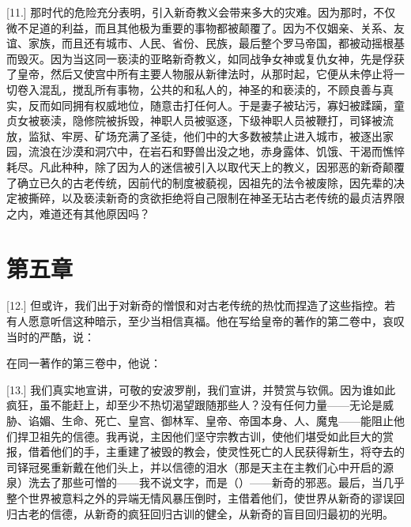 [11.] 那时代的危险充分表明，引入新奇教义会带来多大的灾难。因为那时，不仅微不足道的利益，而且其他极为重要的事物都被颠覆了。因为不仅姻亲、关系、友谊、家族，而且还有城市、人民、省份、民族，最后整个罗马帝国，都被动摇根基而毁灭。因为当这同一亵渎的亚略新奇教义，如同战争女神或复仇女神，先是俘获了皇帝，然后又使宫中所有主要人物服从新律法时，从那时起，它便从未停止将一切卷入混乱，搅乱所有事物，公共的和私人的，神圣的和亵渎的，不顾良善与真实，反而如同拥有权威地位，随意击打任何人。于是妻子被玷污，寡妇被蹂躏，童贞女被亵渎，隐修院被拆毁，神职人员被驱逐，下级神职人员被鞭打，司铎被流放，监狱、牢房、矿场充满了圣徒，他们中的大多数被禁止进入城市，被逐出家园，流浪在沙漠和洞穴中，在岩石和野兽出没之地，赤身露体、饥饿、干渴而憔悴耗尽。凡此种种，除了因为人的迷信被引入以取代天上的教义，因邪恶的新奇颠覆了确立已久的古老传统，因前代的制度被藐视，因祖先的法令被废除，因先辈的决定被撕碎，以及亵渎新奇的贪欲拒绝将自己限制在神圣无玷古老传统的最贞洁界限之内，难道还有其他原因吗？\par


\section{第五章}

\par

[12.] 但或许，我们出于对新奇的憎恨和对古老传统的热忱而捏造了这些指控。若有人愿意听信这种暗示，至少当相信真福。他在写给皇帝的著作的第二卷中，哀叹当时的严酷，说：\par

在同一著作的第三卷中，他说：\par

[13.] 我们真实地宣讲，可敬的安波罗削，我们宣讲，并赞赏与钦佩。因为谁如此疯狂，虽不能赶上，却至少不热切渴望跟随那些人？没有任何力量——无论是威胁、谄媚、生命、死亡、皇宫、御林军、皇帝、帝国本身、人、魔鬼——能阻止他们捍卫祖先的信德。我再说，主因他们坚守宗教古训，使他们堪受如此巨大的赏报，借着他们的手，主重建了被毁的教会，使灵性死亡的人民获得新生，将夺去的司铎冠冕重新戴在他们头上，并以信德的泪水（那是天主在主教们心中开启的源泉）洗去了那些可憎的——我不说文字，而是（）——新奇的邪恶。最后，当几乎整个世界被意料之外的异端无情风暴压倒时，主借着他们，使世界从新奇的谬误回归古老的信德，从新奇的疯狂回归古训的健全，从新奇的盲目回归最初的光明。\par

